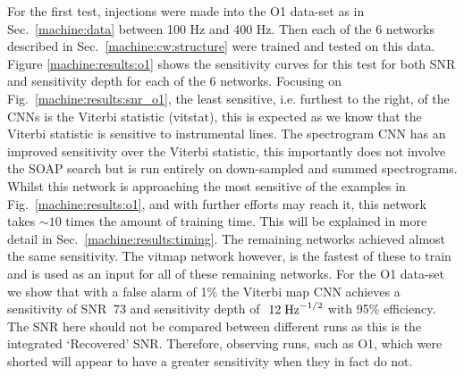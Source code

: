For the first test, injections were made into the O1 data-set as in Sec.~\ref{machine:data} between 100 Hz and 400 Hz. Then each of the 6 networks described in Sec.~\ref{machine:cw:structure} were trained and tested on this data. 
Figure \ref{machine:results:o1} shows the sensitivity curves for this test for both \gls{SNR} and sensitivity depth for each of the 6 networks. Focusing on Fig.~\ref{machine:results:snr_o1}, the least sensitive, i.e. furthest to the right, of the \glspl{CNN} is the Viterbi statistic (vitstat), this is expected as we know that the Viterbi statistic is sensitive to instrumental lines. 
The spectrogram \gls{CNN} has an improved sensitivity over the Viterbi statistic, this importantly does not involve the SOAP search but is run entirely on down-sampled and summed spectrograms. 
Whilst this network is approaching the most sensitive of the examples in Fig.~\ref{machine:results:o1}, and with further efforts may reach it, this network takes $\sim10$ times the amount of training time. This will be explained in more detail in Sec.~\ref{machine:results:timing}.
The remaining networks achieved almost the same sensitivity. 
The vitmap network however, is the fastest of these to train and is used as an input for all of these remaining networks.
For the O1 data-set we show that with a false alarm of 1\% the Viterbi map \gls{CNN} achieves a sensitivity of SNR $~73$ and sensitivity depth of $~12\; {\rm Hz}^{-1/2}$ with 95\% efficiency.
The \gls{SNR} here should not be compared between different runs as this is the integrated `Recovered' \gls{SNR}. Therefore, observing runs, such as O1, which were shorted will appear to have a greater sensitivity when they in fact do not. 

